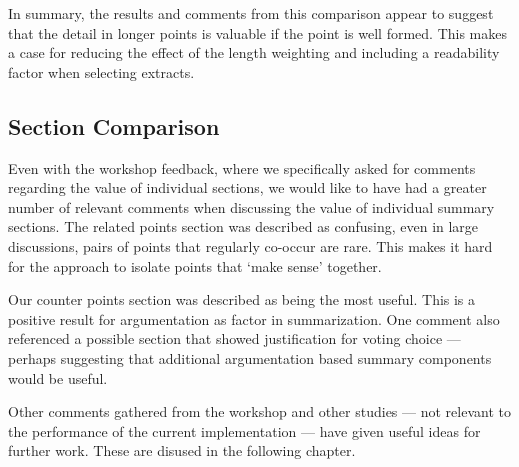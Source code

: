       In summary, the results and comments from this comparison appear to suggest that the detail in longer points is valuable if the point is well formed. This makes a case for reducing the effect of the length weighting and including a readability factor when selecting extracts.

    \tocless\subsection{Section Comparison}
      Even with the workshop feedback, where we specifically asked for comments regarding the value of individual sections, we would like to have had a greater number of relevant comments when discussing the value of individual summary sections. The related points section was described as confusing, even in large discussions, pairs of points that regularly co-occur are rare. This makes it hard for the approach to isolate points that `make sense' together.

      Our counter points section was described as being the most useful. This is a positive result for argumentation as factor in summarization. One comment also referenced a possible section that showed justification for voting choice --- perhaps suggesting that additional argumentation based summary components would be useful.

      Other comments gathered from the workshop and other studies --- not relevant to the performance of the current implementation --- have given useful ideas for further work. These are disused in the following chapter.
